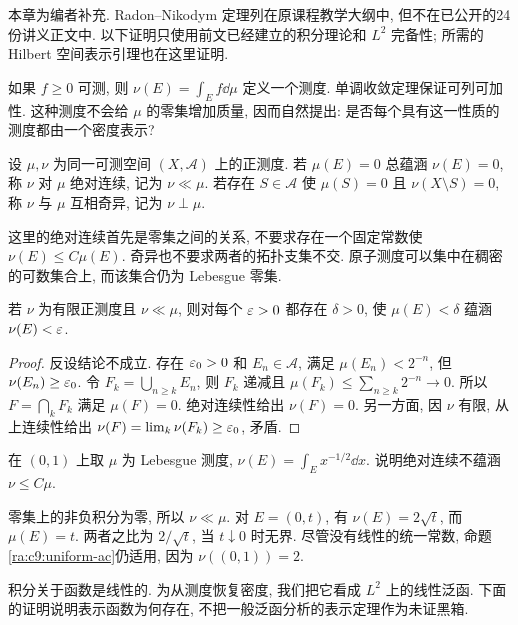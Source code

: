 \label{ra:c9:chapter}
\noindent 本章为编者补充. Radon--Nikodym 定理列在原课程教学大纲中, 但不在已公开的24份讲义正文中. 以下证明只使用前文已经建立的积分理论和 $L^2$ 完备性; 所需的 Hilbert 空间表示引理也在这里证明.

如果 $f\ge0$ 可测, 则 $\nu(E)=\int_E f\dd\mu$ 定义一个测度. 单调收敛定理保证可列可加性. 这种测度不会给 $\mu$ 的零集增加质量, 因而自然提出: 是否每个具有这一性质的测度都由一个密度表示?

\begin{definition}
设 $\mu,\nu$ 为同一可测空间 $(X,\mathcal A)$ 上的正测度. 若 $\mu(E)=0$ 总蕴涵 $\nu(E)=0$, 称 $\nu$ 对 $\mu$ 绝对连续, 记为 $\nu\ll\mu$. 若存在 $S\in\mathcal A$ 使 $\mu(S)=0$ 且 $\nu(X\setminus S)=0$, 称 $\nu$ 与 $\mu$ 互相奇异, 记为 $\nu\perp\mu$.
\end{definition}
这里的绝对连续首先是零集之间的关系, 不要求存在一个固定常数使 $\nu(E)\le C\mu(E)$. 奇异也不要求两者的拓扑支集不交. 原子测度可以集中在稠密的可数集合上, 而该集合仍为 Lebesgue 零集.

\begin{proposition}\label{ra:c9:uniform-ac}
若 $\nu$ 为有限正测度且 $\nu\ll\mu$, 则对每个 $\varepsilon>0$ 都存在 $\delta>0$, 使 $\mu(E)<\delta$ 蕴涵 $\nu(E)<\varepsilon$.
\end{proposition}
\begin{proof}
反设结论不成立. 存在 $\varepsilon_0>0$ 和 $E_n\in\mathcal A$, 满足 $\mu(E_n)<2^{-n}$, 但 $\nu(E_n)\ge\varepsilon_0$. 令 $F_k=\bigcup_{n\ge k}E_n$, 则 $F_k$ 递减且 $\mu(F_k)\le\sum_{n\ge k}2^{-n}\to0$. 所以 $F=\bigcap_kF_k$ 满足 $\mu(F)=0$. 绝对连续性给出 $\nu(F)=0$. 另一方面, 因 $\nu$ 有限, 从上连续性给出 $\nu(F)=\lim_k\nu(F_k)\ge\varepsilon_0$, 矛盾.
\end{proof}

\begin{example}
在 $(0,1)$ 上取 $\mu$ 为 Lebesgue 测度, $\nu(E)=\int_E x^{-1/2}\dd x$. 说明绝对连续不蕴涵 $\nu\le C\mu$.
\end{example}
\begin{solution}
零集上的非负积分为零, 所以 $\nu\ll\mu$. 对 $E=(0,t)$, 有 $\nu(E)=2\sqrt t$, 而 $\mu(E)=t$. 两者之比为 $2/\sqrt t$, 当 $t\downarrow0$ 时无界. 尽管没有线性的统一常数, 命题\ref{ra:c9:uniform-ac}仍适用, 因为 $\nu((0,1))=2$.
\end{solution}

积分关于函数是线性的. 为从测度恢复密度, 我们把它看成 $L^2$ 上的线性泛函. 下面的证明说明表示函数为何存在, 不把一般泛函分析的表示定理作为未证黑箱.


